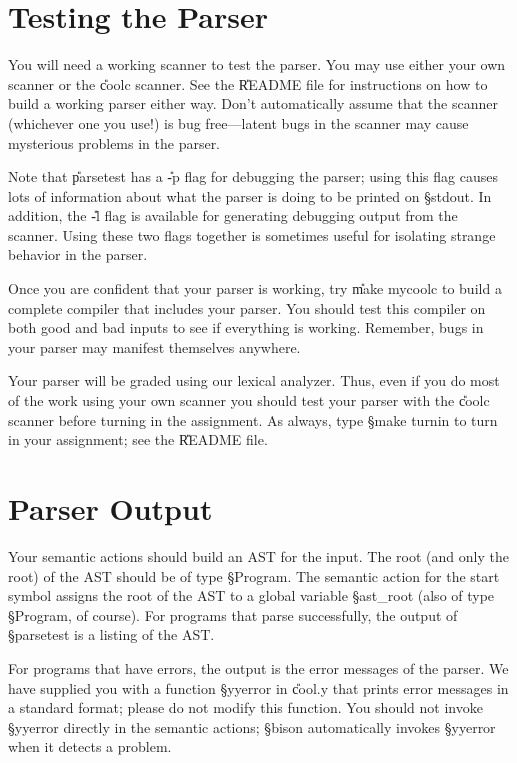 \section{Testing the Parser}

You will need a working scanner to test the parser.  You may use either
your own scanner or the \U{coolc} scanner.  See the \U{README}
file for instructions on how to build a working parser either way.
Don't automatically assume that the scanner (whichever one you use!) is bug
free---latent bugs in the scanner may cause mysterious problems in the
parser.  

Note that \U{parsetest} has a \U{-p} flag for debugging
the parser; using this flag causes lots of information about what the
parser is doing to be printed on \S{stdout}.  In addition, the \U{-l}
flag is available for generating debugging output from the
scanner.  Using these two flags together is sometimes useful for
isolating strange behavior in the parser.

Once you are confident that your parser is working, try \U{make mycoolc} to
build a complete compiler that includes your parser.  You should
test this compiler on both good and bad inputs to see if everything is working.
Remember, bugs in your parser may manifest themselves anywhere.

Your parser will be graded using our lexical analyzer.  Thus,
even if you do most of the work using your own scanner you should test
your parser with the \U{coolc} scanner before turning in the assignment.
As always, type \S{make turnin} to turn in your assignment; see the
\U{README} file.

\section{Parser Output}

Your semantic actions should build an AST for the input.  The root
(and only the root) of the AST should be of type \S{Program}. The
semantic action for the start symbol assigns the root of the AST
to a global variable \S{ast\_root} (also of type \S{Program}, of course).
For programs that parse successfully, the output of \S{parsetest} is
a listing of the AST.

For programs that have errors, the output is the error messages of the
parser.  We have supplied you with a function \S{yyerror} in 
\U{cool.y} that prints error messages in a standard format; please 
do not modify this function.  You should not invoke \S{yyerror} directly
in the semantic actions; \S{bison} automatically invokes \S{yyerror} 
when it detects a problem.

